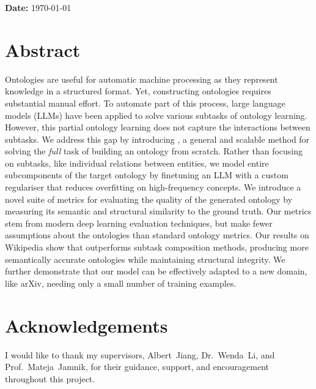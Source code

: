     \bigskip
    \textbf{Date:} \today
\fi
\vspace{\fill}
\makeatother

\chapter*{Abstract}

Ontologies are useful for automatic machine processing as they represent knowledge in a structured format. Yet, constructing ontologies requires substantial manual effort. To automate part of this process, large language models (LLMs) have been applied to solve various subtasks of ontology learning. However, this partial ontology learning does not capture the interactions between subtasks.
We address this gap by introducing \name, a general and scalable method for solving the \emph{full} task of building an ontology from scratch.
Rather than focusing on subtasks, like individual relations between entities, we model entire subcomponents of the target ontology by finetuning an LLM with a custom regulariser that reduces overfitting on high-frequency concepts. We introduce a novel suite of metrics for evaluating the quality of the generated ontology by measuring its semantic and structural similarity to the ground truth. Our metrics stem from modern deep learning evaluation techniques, but make fewer assumptions about the ontologies than standard ontology metrics.
Our results on Wikipedia show that \name outperforms subtask composition methods, producing more semantically accurate ontologies while maintaining structural integrity. We further demonstrate that our model can be effectively adapted to a new domain, like arXiv, needing only a small number of training examples.

\ifsubmission\else

    \chapter*{Acknowledgements}

    I would like to thank my supervisors, Albert~Jiang, Dr.~Wenda~Li, and Prof.~Mateja~Jamnik, for their guidance, support, and encouragement throughout this project.

\fi
\cleardoublepage %
